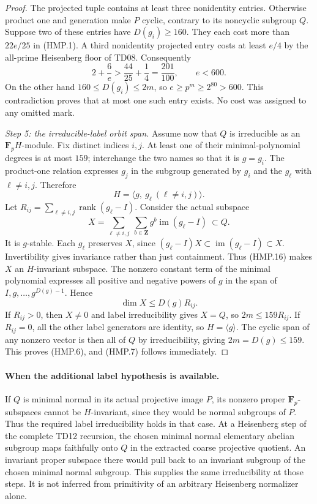 \begin{proof}
The projected tuple contains at least three nonidentity entries.
Otherwise product one and generation make $P$ cyclic, contrary
to its noncyclic subgroup $Q$.
Suppose two of these entries have $D(g_i)\ge160$.
They each cost more than $22e/25$ in (HMP.1).
A third nonidentity projected entry costs at least $e/4$
by the all-prime Heisenberg floor of TD08.
Consequently
\[
          2+\frac6e>\frac{44}{25}+\frac14
                           =\frac{201}{100},
                \qquad e<600.
 \tag{HMP.15}
\]
On the other hand $160\le D(g_i)\le2m$, so
$e\ge p^m\ge2^{80}>600$.  This contradiction proves that at most
one such entry exists.  No cost was assigned to any omitted mark.

\emph{Step 5: the irreducible-label orbit span.}
Assume now that $Q$ is irreducible as an $\mathbf F_pH$-module.
Fix distinct indices $i,j$.  At least one of their minimal-polynomial
degrees is at most $159$; interchange the two names so that it
is $g=g_i$.  The product-one relation expresses $g_j$ in the
subgroup generated by $g_i$ and the $g_\ell$ with $\ell\ne i,j$.
Therefore
\[
                 H=\langle g,\ g_\ell\ (\ell\ne i,j)\rangle .
 \tag{HMP.16}
\]
Let $R_{ij}=\sum_{\ell\ne i,j}\operatorname{rank}(g_\ell-I)$.
Consider the actual subspace
\[
 X=\sum_{\ell\ne i,j}\ \sum_{b\in\mathbf Z}
                         g^b\operatorname{im}(g_\ell-I)
          \ \subset Q .
 \tag{HMP.17}
\]
It is $g$-stable.  Each $g_\ell$ preserves $X$, since
$(g_\ell-I)X\subset\operatorname{im}(g_\ell-I)\subset X$.
Invertibility gives invariance rather than just containment.
Thus (HMP.16) makes $X$ an $H$-invariant subspace.
The nonzero constant term of the minimal polynomial expresses
all positive and negative powers of $g$ in the span of
$I,g,\ldots,g^{D(g)-1}$.  Hence
\[
                          \dim X\le D(g)R_{ij}.
 \tag{HMP.18}
\]
If $R_{ij}>0$, then $X\ne0$ and label irreducibility gives $X=Q$,
so $2m\le159R_{ij}$.
If $R_{ij}=0$, all the other label generators are identity, so
$H=\langle g\rangle$.  The cyclic span of any nonzero vector is
then all of $Q$ by irreducibility, giving $2m=D(g)\le159$.
This proves (HMP.6), and (HMP.7) follows immediately.
\end{proof}

\paragraph{When the additional label hypothesis is available.}
If $Q$ is minimal normal in its actual projective image $P$, its
nonzero proper $\mathbf F_p$-subspaces cannot be $H$-invariant,
since they would be normal subgroups of $P$.  Thus the required
label irreducibility holds in that case.
At a Heisenberg step of the complete TD12 recursion, the chosen
minimal normal elementary abelian subgroup maps faithfully onto
$Q$ in the extracted coarse projective quotient.  An invariant
proper subspace there would pull back to an invariant subgroup
of the chosen minimal normal subgroup.  This supplies the same
irreducibility at those steps.
It is not inferred from primitivity of an arbitrary Heisenberg
normalizer alone.

